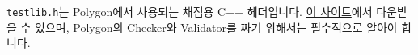 \documentclass{article}
\begin{document}
    \verb|testlib.h|는 Polygon에서 사용되는 채점용 C++ 헤더입니다. {\color{blue}\href{https://github.com/MikeMirzayanov/testlib}{이 사이트}}에서 다운받을 수 있으며, Polygon의 Checker와 Validator를 짜기 위해서는 필수적으로 알아야 합니다.
\end{document}
